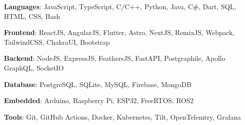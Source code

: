 \textbf{Languages}: JavaScript, TypeScript, C/C++, Python, Java, C\#, Dart, SQL, HTML, CSS, Bash \par
\textbf{Frontend}: ReactJS, AngularJS, Flutter, Astro, NextJS, RemixJS, Webpack, TailwindCSS, ChakraUI, Bootstrap \par
\textbf{Backend}: NodeJS, ExpressJS, FeathersJS, FastAPI, Postgraphile, Apollo GraphQL, SocketIO \par
\textbf{Database}: PostgreSQL, SQLite, MySQL, Firebase, MongoDB \par
\textbf{Embedded}: Arduino, Raspberry Pi, ESP32, FreeRTOS, ROS2 \par
\textbf{Tools}: Git, GitHub Actions, Docker, Kubernetes, Tilt, OpenTelemtry, Grafana 